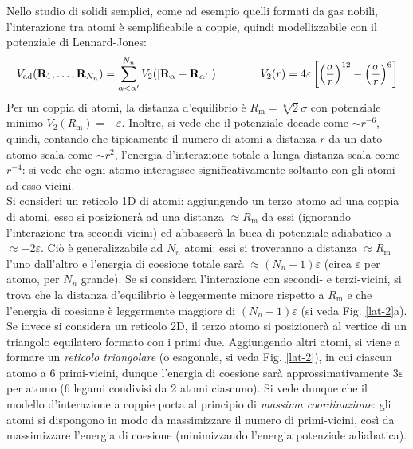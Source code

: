 Nello studio di solidi semplici, come ad esempio quelli formati da gas nobili, l'interazione tra atomi è semplificabile a coppie, quindi modellizzabile con il potenziale di Lennard-Jones:
\begin{equation}
	V_\text{ad}(\mathbf{R}_1 , \dots , \mathbf{R}_{N_n}) = \sum_{\alpha < \alpha'}^{N_n} V_2(\left\lvert\mathbf{R}_\alpha - \mathbf{R}_{\alpha'}\right\rvert)
	\qquad \qquad
	V_2(r) = 4\varepsilon \left[ \left( \frac{\sigma}{r} \right)^{12} - \left( \frac{\sigma}{r} \right)^6 \right]
\end{equation}
Per un coppia di atomi, la distanza d'equilibrio è $ R_\text{m} = \sqrt[6]{2} \sigma $ con potenziale minimo $ V_2(R_\text{m}) = -\varepsilon $. Inoltre, si vede che il potenziale decade come $ \sim r^{-6} $, quindi, contando che tipicamente il numero di atomi a distanza $ r $ da un dato atomo scala come $ \sim r^2 $, l'energia d'interazione totale a lunga distanza scala come $ r^{-4} $: si vede che ogni atomo interagisce significativamente soltanto con gli atomi ad esso vicini. \\
Si consideri un reticolo 1D di atomi: aggiungendo un terzo atomo ad una coppia di atomi, esso si posizionerà ad una distanza $ \approx R_\text{m} $ da essi (ignorando l'interazione tra secondi-vicini) ed abbasserà la buca di potenziale adiabatico a $ \approx -2\varepsilon $. Ciò è generalizzabile ad $ N_n $ atomi: essi si troveranno a distanza $ \approx R_\text{m} $ l'uno dall'altro e l'energia di coesione totale sarà $ \approx (N_n - 1) \varepsilon $ (circa $ \varepsilon $ per atomo, per $ N_n $ grande). Se si considera l'interazione con secondi- e terzi-vicini, si trova che la distanza d'equilibrio è leggermente minore rispetto a $ R_\text{m} $ e che l'energia di coesione è leggermente maggiore di $ (N_n - 1) \varepsilon $ (si veda Fig. \ref{lat-2}a). \\
Se invece si considera un reticolo 2D, il terzo atomo si posizionerà al vertice di un triangolo equilatero formato con i primi due. Aggiungendo altri atomi, si viene a formare un \textit{reticolo triangolare} (o esagonale, si veda Fig. \ref{lat-2}), in cui ciascun atomo a 6 primi-vicini, dunque l'energia di coesione sarà approssimativamente $ 3\varepsilon $ per atomo (6 legami condivisi da 2 atomi ciascuno). Si vede dunque che il modello d'interazione a coppie porta al principio di \textit{massima coordinazione}: gli atomi si dispongono in modo da massimizzare il numero di primi-vicini, così da massimizzare l'energia di coesione (minimizzando l'energia potenziale adiabatica). \\
